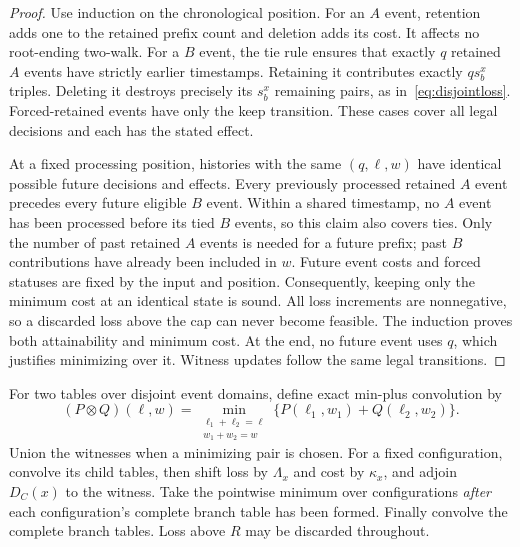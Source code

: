 \documentclass[11pt]{article}
\theoremstyle{remark}
\begin{document}
\begin{proof}
Use induction on the chronological position. For an $A$ event, retention adds
one to the retained prefix count and deletion adds its cost. It affects no
root-ending two-walk. For a $B$ event, the tie rule ensures that exactly $q$
retained $A$ events have strictly earlier timestamps. Retaining it contributes
exactly $q s_b^x$ triples. Deleting it destroys precisely its $s_b^x$ remaining
pairs, as in~\eqref{eq:disjointloss}. Forced-retained events have only the keep
transition. These cases cover all legal decisions and each has the stated
effect.

At a fixed processing position, histories with the same $(q,\ell,w)$ have
identical possible future decisions and effects. Every previously processed
retained $A$ event precedes every future eligible $B$ event. Within a shared
timestamp, no $A$ event has been processed before its tied $B$ events, so this
claim also covers ties. Only the number of past retained $A$ events is needed
for a future prefix; past $B$ contributions have already been included in $w$.
Future event costs and forced statuses are fixed by the input and position.
Consequently, keeping only the minimum cost at an identical state is sound.
All loss increments are nonnegative, so a discarded loss above the cap can
never become feasible. The induction proves both attainability and minimum
cost. At the end, no future event uses $q$, which justifies minimizing over it.
Witness updates follow the same legal transitions.
\end{proof}

For two tables over disjoint event domains, define exact min-plus convolution
by
\begin{equation}
 (P\otimes Q)(\ell,w)=
 \min_{\substack{\ell_1+\ell_2=\ell\\w_1+w_2=w}}
        \{P(\ell_1,w_1)+Q(\ell_2,w_2)\}.
 \label{eq:convolution}
\end{equation}
Union the witnesses when a minimizing pair is chosen. For a fixed configuration,
convolve its child tables, then shift loss by $\Lambda_x$ and cost by
$\kappa_x$, and adjoin $D_C(x)$ to the witness. Take the pointwise minimum over
configurations \emph{after} each
configuration's complete branch table has been formed. Finally convolve
the complete branch tables. Loss above $R$ may be discarded throughout.
\end{document}
